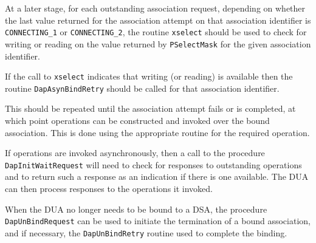 At a later stage, for each outstanding association request, depending
on whether the last value returned for the association attempt on that
association identifier is \verb"CONNECTING_1" or \verb"CONNECTING_2",
the routine \verb"xselect" should be used to check for writing or
reading on the value returned by \verb"PSelectMask" for the given
association identifier.

If the call to \verb"xselect" indicates that writing (or reading) is
available then the routine \verb"DapAsynBindRetry" should be called
for that association identifier.

This should be repeated until the association attempt fails or is
completed, at which point operations can be constructed and invoked over
the bound association.
This is done using the appropriate routine for the required operation.

If operations are invoked asynchronously, then a call to
the procedure \verb"DapInitWaitRequest" will need to check for responses
to outstanding operations and to return such a response as an
indication if there is one available.
The DUA can then process responses to the operations it invoked.

When the DUA no longer needs to be bound to a DSA, the
procedure \verb"DapUnBindRequest" can be used to initiate the termination
of a bound association, and if necessary, the \verb"DapUnBindRetry"
routine used to complete the binding.
